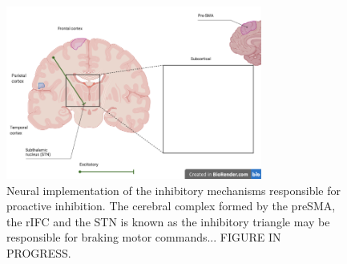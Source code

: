 \documentclass[utf8]{template/frontiersSCNS} %
\begin{document}
\begin{figure}[ht] %
\begin{center}
\includegraphics[width=0.75\textwidth]{figures/inhibitory_triangle.png} %
\end{center}
\caption{Neural implementation of the inhibitory mechanisms responsible for proactive inhibition. The cerebral complex formed by the preSMA, the rIFC and the STN is known as the inhibitory triangle may be responsible for braking motor commands... FIGURE IN PROGRESS.}\label{fig:2}
\end{figure}

\end{document}
